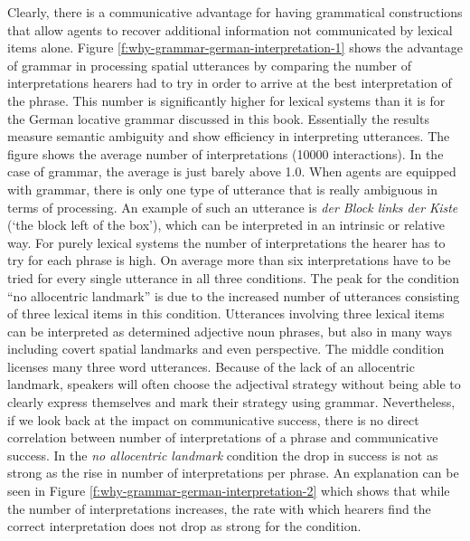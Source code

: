 Clearly, there is a communicative 
advantage for having grammatical constructions that allow agents to recover
additional information not communicated by lexical items alone.
Figure \ref{f:why-grammar-german-interpretation-1} shows the advantage of grammar 
in processing spatial utterances by comparing the number
of interpretations hearers had to try in order to arrive at the best interpretation
of the phrase. This number is significantly higher for lexical systems than it is 
for the German locative grammar discussed in this book. 
Essentially the results measure semantic ambiguity and show efficiency 
in interpreting utterances. The figure shows the average number 
of interpretations (10000 interactions). In the case of grammar, the 
average is just barely above 1.0. When agents are equipped 
with grammar, there is only one type of utterance that is really 
ambiguous in terms of processing. An example of such an utterance 
is \textit{der Block links der Kiste} (`the block left of the box'),
which can be interpreted in an intrinsic or relative way. For purely 
lexical systems the number of interpretations the hearer has to try for 
each phrase is high. On average more than six interpretations have 
to be tried for every single utterance in all three conditions. The peak 
for the condition ``no allocentric landmark'' is due to the 
increased number of utterances consisting of three lexical 
items in this condition. Utterances involving three lexical items can 
be interpreted as determined adjective noun phrases, but also in many 
ways including covert spatial landmarks and even perspective.
The middle condition licenses many three word utterances. Because of the 
lack of an allocentric landmark, speakers will often choose the adjectival 
strategy without being able to clearly express themselves and mark 
their strategy using grammar. Nevertheless, if we look back at the 
impact on communicative success, there is no direct correlation 
between number of interpretations of a phrase
and communicative success. In the \emph{no allocentric landmark} 
condition the drop in success is not as strong as the rise in number 
of interpretations per phrase. An explanation can be seen in Figure 
\ref{f:why-grammar-german-interpretation-2}
which shows that while the number of interpretations increases, the 
rate with which hearers find the correct interpretation does not 
drop as strong for the condition.

